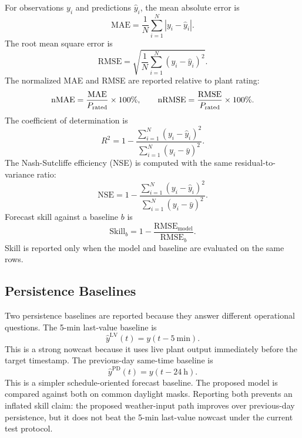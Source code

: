 For observations $y_i$ and predictions $\hat{y}_i$, the mean absolute error is
\begin{equation}
\mathrm{MAE}=\frac{1}{N}\sum_{i=1}^{N}|y_i-\hat{y}_i|.
\label{eq:mae}
\end{equation}
The root mean square error is
\begin{equation}
\mathrm{RMSE}=\sqrt{\frac{1}{N}\sum_{i=1}^{N}(y_i-\hat{y}_i)^2}.
\label{eq:rmse}
\end{equation}
The normalized MAE and RMSE are reported relative to plant rating:
\begin{equation}
\mathrm{nMAE}=\frac{\mathrm{MAE}}{P_{\mathrm{rated}}}\times100\%, \qquad
\mathrm{nRMSE}=\frac{\mathrm{RMSE}}{P_{\mathrm{rated}}}\times100\%.
\label{eq:normalised_errors}
\end{equation}
The coefficient of determination is
\begin{equation}
R^2=1-\frac{\sum_{i=1}^{N}(y_i-\hat{y}_i)^2}
{\sum_{i=1}^{N}(y_i-\bar{y})^2}.
\label{eq:r2}
\end{equation}
The Nash-Sutcliffe efficiency (NSE) is computed with the same residual-to-variance ratio:
\begin{equation}
\mathrm{NSE}=1-\frac{\sum_{i=1}^{N}(y_i-\hat{y}_i)^2}
{\sum_{i=1}^{N}(y_i-\bar{y})^2}.
\label{eq:nse}
\end{equation}
Forecast skill against a baseline $b$ is
\begin{equation}
\mathrm{Skill}_b=1-\frac{\mathrm{RMSE}_{\mathrm{model}}}
{\mathrm{RMSE}_{b}}.
\label{eq:skill}
\end{equation}
Skill is reported only when the model and baseline are evaluated on the same rows.

\subsection{Persistence Baselines}

Two persistence baselines are reported because they answer different operational questions. The 5-min last-value baseline is
\begin{equation}
\hat{y}^{\mathrm{LV}}(t)=y(t-5~\mathrm{min}).
\label{eq:last_value_persistence}
\end{equation}
This is a strong nowcast because it uses live plant output immediately before the target timestamp. The previous-day same-time baseline is
\begin{equation}
\hat{y}^{\mathrm{PD}}(t)=y(t-24~\mathrm{h}).
\label{eq:previous_day_persistence}
\end{equation}
This is a simpler schedule-oriented forecast baseline. The proposed model is compared against both on common daylight masks. Reporting both prevents an inflated skill claim: the proposed weather-input path improves over previous-day persistence, but it does not beat the 5-min last-value nowcast under the current test protocol.

